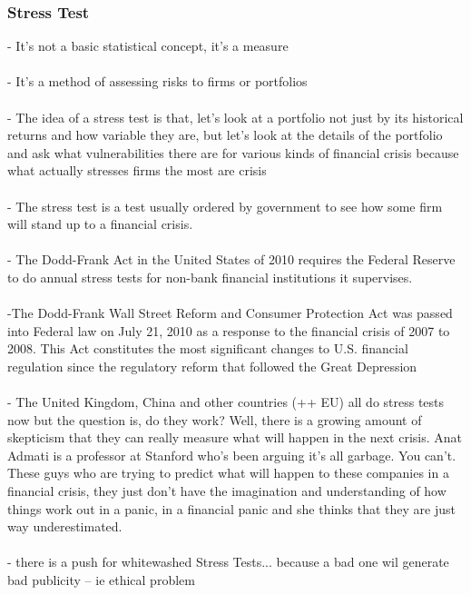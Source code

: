 \documentclass{article} %
\begin{document}
     		\subsubsection*{Stress Test}
     		
     		- It's not a basic statistical concept, it's a measure \\
     		\\
     		- It's a method of assessing risks to firms or portfolios \\
     		\\
     		- The idea of a stress test is that, let's look at a portfolio not just by its historical returns and how variable they are, but let's look at the details of the portfolio and ask what vulnerabilities there are for various kinds of financial crisis because what actually stresses firms the most are crisis \\
     		\\
     		- The stress test is a test usually ordered by government to see how some firm will stand up to a financial crisis. \\
     		\\
     		- The Dodd-Frank Act in the United States of 2010 requires the Federal Reserve to do annual stress tests for non-bank financial institutions it supervises. \\
     		\\
     		-The Dodd-Frank Wall Street Reform and Consumer Protection Act was passed into Federal law on July 21, 2010 as a response to the financial crisis of 2007 to 2008. This Act constitutes the most significant changes to U.S. financial regulation since the regulatory reform that followed the Great Depression \\
     		\\
     		- The United Kingdom, China and other countries (++ EU) all do stress tests now but the question is, do they work? Well, there is a growing amount of skepticism that they can really measure what will happen in the next crisis. Anat Admati is a professor at Stanford who's been arguing it's all garbage. You can't. These guys who are trying to predict what will happen to these companies in a financial crisis, they just don't have the imagination and understanding of how things work out in a panic, in a financial panic and she thinks that they are just way underestimated. \\
     		\\
     		- there is a push for whitewashed Stress Tests... because a bad one wil generate bad publicity -- ie ethical problem \\
     		
\end{document}
